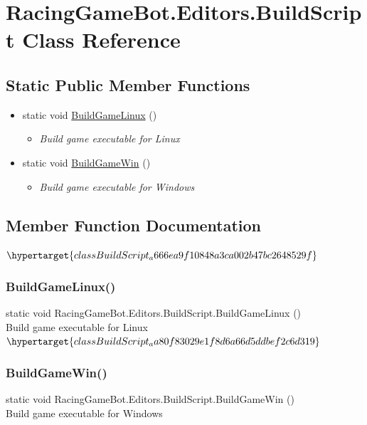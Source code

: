 \hypertarget{classRacingGameBot_1_1Editors_1_1BuildScript}{}
\section{RacingGameBot.Editors.BuildScript Class Reference}
\label{classRacingGameBot_1_1Editors_1_1BuildScript}
\subsection*{Static Public Member Functions}

\begin{itemize}
\item[] 
static void \mbox{\hyperlink{classBuildScript_a666ea9f10848a3ca002b47bc2648529f}{BuildGameLinux}} ()
\begin{itemize}\small\item[]\em Build game executable for Linux \end{itemize}\item[] 
static void \mbox{\hyperlink{classBuildScript_aa80f83029e1f8d6a66d5ddbef2c6d319}{BuildGameWin}} ()
\begin{itemize}\small\item[]\em Build game executable for Windows \end{itemize}\end{itemize}


\subsection{Member Function Documentation}
\mbox{$\hypertarget{classBuildScript_a666ea9f10848a3ca002b47bc2648529f}$
\label{classBuildScript_a666ea9f10848a3ca002b47bc2648529f}} 
\subsubsection{\texorpdfstring{BuildGameLinux()}{BuildGameLinux()}}
{\footnotesize\ttfamily static void RacingGameBot.Editors.BuildScript.BuildGameLinux ()}\\
Build game executable for Linux \\
\mbox{$\hypertarget{classBuildScript_aa80f83029e1f8d6a66d5ddbef2c6d319}$
\label{classBuildScript_aa80f83029e1f8d6a66d5ddbef2c6d319}} 
\subsubsection{\texorpdfstring{BuildGameWin()}{BuildGameWin()}}
{\footnotesize\ttfamily static void RacingGameBot.Editors.BuildScript.BuildGameWin ()}\\
Build game executable for Windows \\
